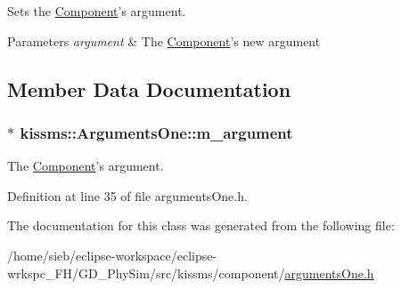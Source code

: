 Sets the \hyperlink{classkissms_1_1_component}{Component}'s argument. 


\begin{DoxyParams}{Parameters}
{\em argument} & The \hyperlink{classkissms_1_1_component}{Component}'s new argument \\
\hline
\end{DoxyParams}


\subsection{Member Data Documentation}
\hypertarget{classkissms_1_1_arguments_one_a13edd850fa593c54b343b4538b99a190}{
\subsubsection[{m\-\_\-argument}]{$\ast$ kissms\-::\-Arguments\-One\-::m\-\_\-argument\hspace{0.3cm}{\ttfamily [protected]}}}\label{classkissms_1_1_arguments_one_a13edd850fa593c54b343b4538b99a190}


The \hyperlink{classkissms_1_1_component}{Component}'s argument. 



Definition at line 35 of file arguments\-One.\-h.



The documentation for this class was generated from the following file\-:\begin{DoxyCompactItemize}
\item 
/home/sieb/eclipse-\/workspace/eclipse-\/wrkspc\-\_\-\-F\-H/\-G\-D\-\_\-\-Phy\-Sim/src/kissms/component/\hyperlink{arguments_one_8h}{arguments\-One.\-h}\end{DoxyCompactItemize}
